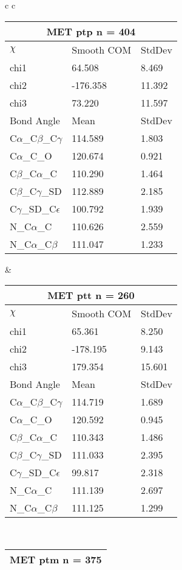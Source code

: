 \begin{longtable}{ c c }
  \begin{tabular}{ l l l }
  \toprule
  \multicolumn{3}{c}{MET \textbf{ptp} n = 404} \\ \toprule
  $\chi$       & Smooth COM & StdDev \\ \midrule
  chi1 & 64.508 & 8.469 \\ 
  chi2 & -176.358 & 11.392 \\ 
  chi3 & 73.220 & 11.597 \\ \midrule
  Bond Angle   & Mean     & StdDev \\ \midrule
  C$\alpha$\_C$\beta$\_C$\gamma$ & 114.589 & 1.803\\
  C$\alpha$\_C\_O & 120.674 & 0.921\\
  C$\beta$\_C$\alpha$\_C & 110.290 & 1.464\\
  C$\beta$\_C$\gamma$\_SD & 112.889 & 2.185\\
  C$\gamma$\_SD\_C$\epsilon$ & 100.792 & 1.939\\
  N\_C$\alpha$\_C & 110.626 & 2.559\\
  N\_C$\alpha$\_C$\beta$ & 111.047 & 1.233\\
  \bottomrule
  \end{tabular}
  &
  \begin{tabular}{ l l l }
  \toprule
  \multicolumn{3}{c}{MET \textbf{ptt} n = 260} \\ \toprule
  $\chi$       & Smooth COM & StdDev \\ \midrule
  chi1 & 65.361 & 8.250 \\ 
  chi2 & -178.195 & 9.143 \\ 
  chi3 & 179.354 & 15.601 \\ \midrule
  Bond Angle   & Mean     & StdDev \\ \midrule
  C$\alpha$\_C$\beta$\_C$\gamma$ & 114.719 & 1.689\\
  C$\alpha$\_C\_O & 120.592 & 0.945\\
  C$\beta$\_C$\alpha$\_C & 110.343 & 1.486\\
  C$\beta$\_C$\gamma$\_SD & 111.033 & 2.395\\
  C$\gamma$\_SD\_C$\epsilon$ & 99.817 & 2.318\\
  N\_C$\alpha$\_C & 111.139 & 2.697\\
  N\_C$\alpha$\_C$\beta$ & 111.125 & 1.299\\
  \bottomrule
  \end{tabular}
  \\
  \begin{tabular}{ l l l }
  \toprule
  \multicolumn{3}{c}{MET \textbf{ptm} n = 375} \\ \toprule

\end{tabular}
\end{longtable}
